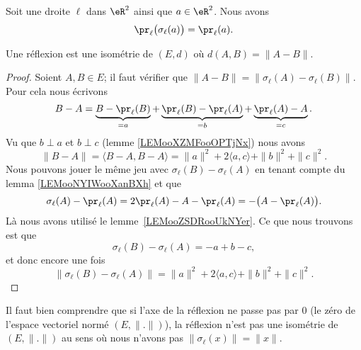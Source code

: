 \begin{lemma}       \label{LEMooNYIWooXanBXh}
    Soit une droite \( \ell\) dans \( \eR^2\) ainsi que \( a\in \eR^2\). Nous avons
    \begin{equation}
        \pr_{\ell}\big( \sigma_{\ell}(a) \big)=\pr_{\ell}(a).
    \end{equation}
\end{lemma}

\begin{proposition}      \label{PROPooFSVEooWmJsnv}
	Une réflexion est une isométrie de \( (E,d)\) où \( d(A,B)=\| A-B \|\).
\end{proposition}

\begin{proof}
	Soient \( A,B\in E\); il faut vérifier que \( \| A-B \|=\| \sigma_{\ell}(A)-\sigma_{\ell}(B) \|\). Pour cela nous écrivons
	\begin{equation}
		B-A=\underbrace{B-\pr_{\ell}(B)}_{=a}+\underbrace{\pr_{\ell}(B)-\pr_{\ell}(A)}_{=b}+\underbrace{\pr_{\ell}(A)-A}_{=c}.
	\end{equation}
    Vu que \( b\perp a\) et \( b\perp c\) (lemme \ref{LEMooXZMFooOPTjNx}) nous avons
	\begin{equation}
		\| B-A \|=\langle B-A, B-A\rangle =\| a \|^2+2\langle a, c\rangle +\| b \|^2+\| c \|^2.
	\end{equation}
    Nous pouvons jouer le même jeu avec \( \sigma_{\ell}(B)-\sigma_{\ell}(A)\) en tenant compte du lemma \ref{LEMooNYIWooXanBXh} et que
	\begin{equation}
		\sigma_{\ell}(A)-\pr_{\ell}(A)=2\pr_{\ell}(A)-A-\pr_{\ell}(A)=-\big( A-\pr_{\ell}(A) \big).
	\end{equation}
	Là nous avons utilisé le lemme~\ref{LEMooZSDRooUkNYer}. Ce que nous trouvons est que
	\begin{equation}
		\sigma_{\ell}(B)-\sigma_{\ell}(A)=-a+b-c,
	\end{equation}
	et donc encore une fois
	\begin{equation}
		\| \sigma_{\ell}(B)-\sigma_{\ell}(A) \|=\| a \|^2+2\langle a, c\rangle +\| b \|^2+\| c \|^2.
	\end{equation}
\end{proof}

\begin{remark}
	Il faut bien comprendre que si l'axe de la réflexion ne passe pas par \( 0\) (le zéro de l'espace vectoriel normé \( (E,\| . \|)\)), la réflexion n'est pas une isométrie de \( (E,\| . \|)\) au sens où nous n'avons pas \( \| \sigma_{\ell}(x) \|=\| x \|\).
\end{remark}

